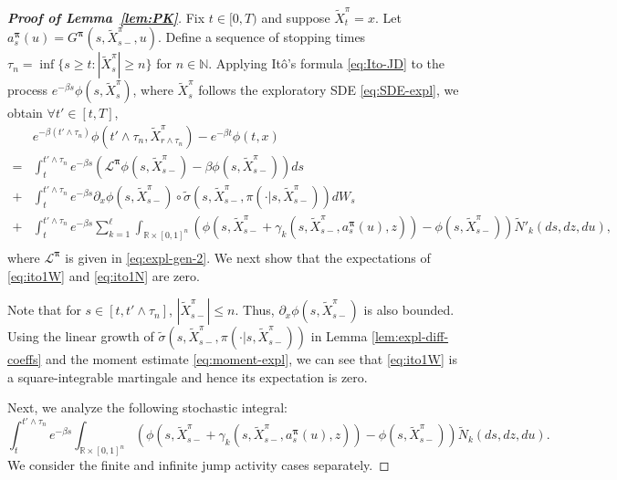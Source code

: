 \documentclass[11pt]{article}
\newcommand{\1}{\mathbbm{1}}
\newcommand{\bpi}{\boldsymbol{\pi}}
\begin{document}

\begin{proof}[\bf Proof of Lemma~\ref{lem:PK}]
	Fix $t\in[0,T)$ and suppose $\tilde X^{\pi}_t=x$. Let $a_s^{\bpi}(u)=G^{\bpi}(s,\tilde X^{\pi}_{s-},u)$. Define a sequence of stopping times $\tau_n = \inf \{s \ge t: |\tilde X^{\pi}_s| \ge n\}$ for $n\in\mathbb{N}$.
	Applying It\^{o}'s formula \eqref{eq:Ito-JD} to the process $e^{-\beta s}\phi(s,  \tilde X^{\pi}_s)$, where $\tilde X^{\pi}_s$ follows the exploratory SDE \eqref{eq:SDE-expl}, we obtain $\forall t'\in[t,T]$,
	\begin{align}
		&e^{-\beta(t'\wedge\tau_n)}\phi(t'\wedge\tau_n,  \tilde X^{\pi}_{r\wedge\tau_n}) - e^{-\beta t}\phi(t, x)\\
		=& \int_t^{t'\wedge\tau_n} e^{-\beta s}\left(\mathcal{L}^{\bpi} \phi(s, \tilde X^{\pi}_{s-})-\beta \phi(s, \tilde X^{\pi}_{s-}) \right)ds \\
		+& \int_t^{t'\wedge\tau_n} e^{-\beta s}\partial_x\phi(s, \tilde X^{\pi}_{s-})\circ\tilde{\sigma}(s, \tilde X^{\pi}_{s-}, \pi(\cdot|s, \tilde X^{\pi}_{s-})) dW_s  \label{eq:ito1W} \\
		+& \int_t^{t'\wedge\tau_n} e^{-\beta s}\sum_{k=1}^{\ell}\int_{\mathbb{R}\times[0,1]^n} \left( \phi(s, \tilde X^{\pi}_{s-}+ \gamma_k(s, \tilde X^{\pi}_{s-}, a_s^{\bpi}(u), z)) -  \phi(s, \tilde X^{\pi}_{s-})  \right)  \widetilde{N}'_k(ds, dz, du), \\
		\label{eq:ito1N}
	\end{align}
	where $ \mathcal{L}^{\bpi}$ is  given in \eqref{eq:expl-gen-2}. We next show that the expectations of \eqref{eq:ito1W} and \eqref{eq:ito1N} are zero.
	
	Note that for $s\in [t,t'\wedge\tau_n]$, $|\tilde X^{\pi}_{s-}|\leq n$. Thus, $\partial_x\phi(s, \tilde X^{\pi}_{s-})$ is also bounded. Using the linear growth of $\tilde{\sigma}(s, \tilde X^{\pi}_{s-}, \pi(\cdot|s, \tilde X^{\pi}_{s-}))$ in Lemma \ref{lem:expl-diff-coeffs} and the moment estimate \eqref{eq:moment-expl}, we can see that \eqref{eq:ito1W} is a square-integrable martingale and hence its expectation is zero.
	
	Next, we analyze the following stochastic integral:
	\begin{equation}\label{eq:FK-jump-integral}
		\int_t^{t'\wedge\tau_n} e^{-\beta s}\int_{\mathbb{R}\times[0,1]^n} \left( \phi (s, \tilde X^{\pi}_{s-}+ \gamma_k(s, \tilde X^{\pi}_{s-}, a_s^{\bpi}(u),z)) -  \phi(s, \tilde X^{\pi}_{s-})  \right)  \widetilde{N}_k(ds, dz, du).
	\end{equation}
	We consider the finite and infinite jump activity cases separately.
	

\end{proof}
\end{document}
